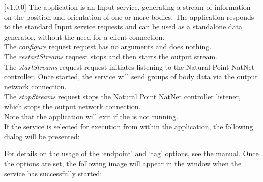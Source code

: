 [v1.0.0]
The  application is an Input service,
generating a stream of information on the position and orientation of one or more bodies.
The application responds to the standard Input service requests and can be used as a
standalone data generator, without the need for a client connection.\\

The \emph{configure} request request has no arguments and does nothing.\\

The \emph{restartStreams} request stops and then starts the output stream.\\

The \emph{startStreams} request request initiates listening to the Natural Point NatNet
controller.
Once started, the service will send groups of body data via the output \yarp{} network
connection.\\

The \emph{stopStreams} request stops the Natural Point NatNet controller listener, which
stops the output \yarp{} network connection.\\ 

Note that the application will exit if the \emph{\RS} is not running.
\insertAppParameters
\insertTagDescription{\NNI}
\insertInputServiceComment\\

\insertStandardServiceCommands
\secondaryEnd
\condPage
{}
If the service is selected for execution from within the \emph{\MMMU} application, the
following dialog will be presented:

For details on the usage of the `endpoint' and `tag' options, see the \emph{\MMMU} manual.
Once the options are set, the following image will appear in the \emph{\MMMU} window when
the service has successfully started:
\secondaryEnd
\primaryEnd{}

